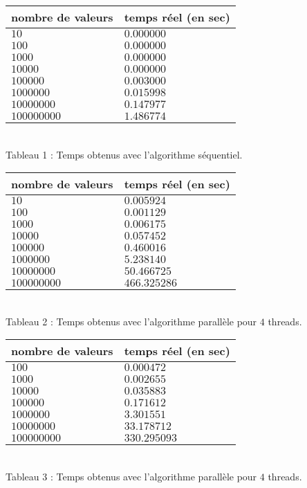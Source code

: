 \begin{center}
\begin{tabular}{ | l | l | }
    \hline
    nombre de valeurs   & temps réel (en sec) \\ 
    \hline
    $10$     			& $0.000000$ \\        
    $100$ 		        & $0.000000$ \\         
    $1000$ 		        & $0.000000$ \\           
    $10000$ 		    & $0.000000$ \\           
    $100000$ 		    & $0.003000$ \\           
    $1000000$ 	        & $0.015998$ \\           
    $10000000$ 	        & $0.147977$ \\           
    $100000000$ 	    & $1.486774$ \\ \hline           
\end{tabular}\\
Tableau 1 : Temps obtenus avec l'algorithme séquentiel.\\

\vskip0.5cm

\begin{tabular}{ | l | l | }
    \hline
    nombre de valeurs     & temps réel (en sec) \\     \hline
    $10$                  & $0.005924$ \\
    $100$                 & $0.001129$ \\
    $1000$                & $0.006175$ \\
    $10000$               & $0.057452$ \\
    $100000$              & $0.460016$ \\
    $1000000$             & $5.238140$ \\
    $10000000$            & $50.466725$ \\
    $100000000$           & $466.325286$ \\ \hline
\end{tabular}\\
Tableau 2 : Temps obtenus avec l'algorithme parallèle pour $4$ threads.\\

\vskip0.5cm

\begin{tabular}{ | l | l | }
    \hline
    nombre de valeurs      & temps réel (en sec) \\     \hline
    $100$                  & $0.000472$ \\
    $1000$                 & $0.002655$ \\
    $10000$                & $0.035883$ \\
    $100000$               & $0.171612$ \\
    $1000000$              & $3.301551$ \\
    $10000000$             & $33.178712$ \\
    $100000000$            & $330.295093$ \\ \hline
\end{tabular}\\
Tableau 3 : Temps obtenus avec l'algorithme parallèle pour $4$ threads.
\end{center}